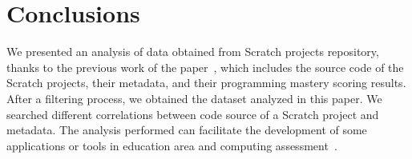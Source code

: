 \documentclass[a4paper,twocolumn,10pt]{article}
\begin{document}
\section{Conclusions}
\label{sec:conclusions}

We presented an analysis of data obtained from Scratch projects repository, thanks
to the previous work of the paper~\cite{aivaloglou2017dataset}, which includes the source code of the Scratch
projects, their metadata, and their programming mastery scoring results.
After a filtering process, we obtained the dataset analyzed in this paper. We
searched different correlations between code source of a Scratch project and metadata.
The analysis performed can facilitate the development of some applications or tools
in education area and computing assessment~\cite{robles2018ontools}.


 

\end{document}
